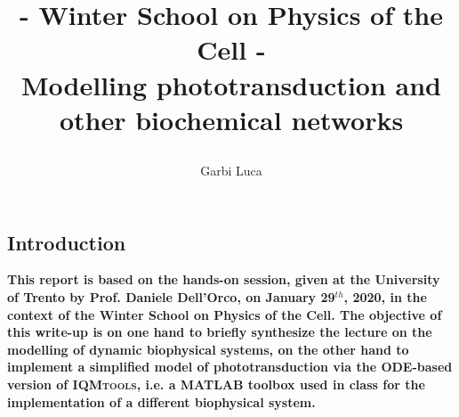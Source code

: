 \documentclass[pdf, color,12pt]{CITnote}
\author{\begin{LARGE} Garbi Luca \end{LARGE}}
\title{\begin{LARGE}- Winter School on Physics of the Cell -
\\ Modelling phototransduction and other biochemical networks\end{LARGE}}
\date{\begin{Large} \today \end{Large}}
\begin{document}
\maketitle


	
\begin{adjustwidth*}{0.4cm}{0.4cm}
\begin{center}
\section*{\large Introduction}
\end{center}

{\bf{This report is based on the hands-on session, given at the University of Trento by Prof. Daniele Dell'Orco, on January 29$^{th}$, 2020, in the context of the Winter School on Physics of the Cell. The objective of this write-up is on one hand to briefly synthesize the lecture on the modelling of dynamic biophysical systems, on the other hand to implement a simplified model of phototransduction via the ODE-based version of \textsc{IQMtools}, i.e.$ $ a \textsc{MATLAB} toolbox used in class for the implementation of a different biophysical system.
}}\\
\end{adjustwidth*}
\end{document}
